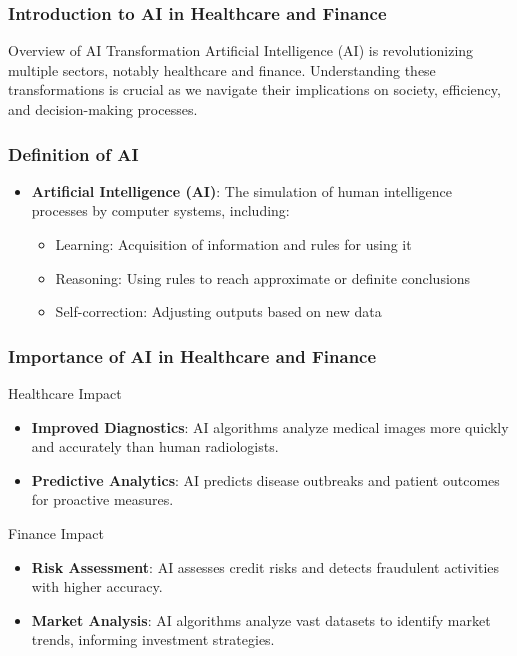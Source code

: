 \documentclass[aspectratio=169]{beamer}
\begin{document}
\frame{\titlepage}

\begin{frame}[fragile]
    \frametitle{Introduction to AI in Healthcare and Finance}
    \begin{block}{Overview of AI Transformation}
        Artificial Intelligence (AI) is revolutionizing multiple sectors, notably healthcare and finance. 
        Understanding these transformations is crucial as we navigate their implications on society, efficiency, and decision-making processes.
    \end{block}
\end{frame}

\begin{frame}[fragile]
    \frametitle{Definition of AI}
    \begin{itemize}
        \item \textbf{Artificial Intelligence (AI)}: The simulation of human intelligence processes by computer systems, including:
        \begin{itemize}
            \item Learning: Acquisition of information and rules for using it
            \item Reasoning: Using rules to reach approximate or definite conclusions
            \item Self-correction: Adjusting outputs based on new data
        \end{itemize}
    \end{itemize}
\end{frame}

\begin{frame}[fragile]
    \frametitle{Importance of AI in Healthcare and Finance}
    \begin{block}{Healthcare Impact}
        \begin{itemize}
            \item \textbf{Improved Diagnostics}: AI algorithms analyze medical images more quickly and accurately than human radiologists.
            \item \textbf{Predictive Analytics}: AI predicts disease outbreaks and patient outcomes for proactive measures.
        \end{itemize}
    \end{block}
    
    \begin{block}{Finance Impact}
        \begin{itemize}
            \item \textbf{Risk Assessment}: AI assesses credit risks and detects fraudulent activities with higher accuracy.
            \item \textbf{Market Analysis}: AI algorithms analyze vast datasets to identify market trends, informing investment strategies.
        \end{itemize}
    \end{block}
\end{frame}
\end{document}
